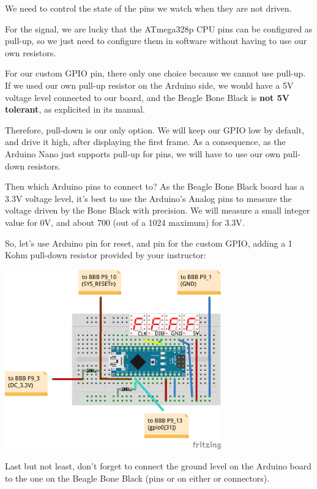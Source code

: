 We need to control the state of the pins we watch when they are not
driven.

For the  signal, we are lucky that the ATmega328p CPU
pins can be configured as pull-up, so we just need to configure them
in software without having to use our own resistors.

For our custom GPIO pin, there only one choice because we cannot use
pull-up. If we used our own pull-up resistor on the Arduino side,
we would have a 5V voltage level connected to our board, and the Beagle
Bone Black is {\bf not 5V tolerant}, as explicited in its manual.

Therefore, pull-down is our only option. We will keep our GPIO low
by default, and drive it high, after displaying the first
frame. As a consequence, as the Arduino Nano just supports pull-up for
pins, we will have to use our own pull-down resistors.

Then which Arduino pins to connect to? As the Beagle Bone Black board
has a 3.3V voltage level, it's best to use the Arduino's Analog pins to
measure the voltage driven by the Bone Black with precision. We will measure a
small integer value for 0V, and about 700 (out of a 1024 maximum) for
3.3V.

So, let's use Arduino pin  for reset, and pin  for the
custom GPIO, adding a 1 Kohm pull-down resistor provided by your
instructor:

\begin{center}
\includegraphics[width=0.7\textwidth]{labs/boot-time-hardware-measurement/nano-final.png}
\end{center}

Last but not least, don't forget to connect the ground level
on the Arduino board to the one on the Beagle Bone Black (pins 
or  on either  or  connectors).

